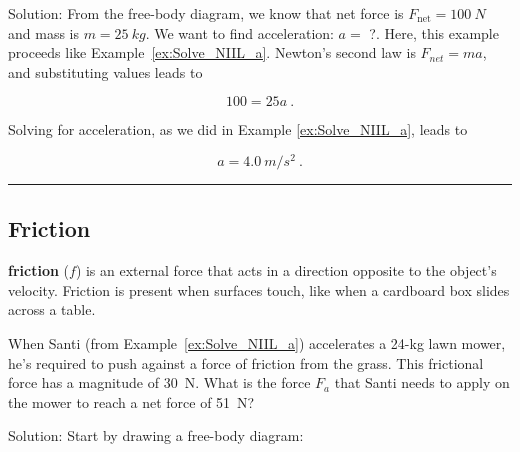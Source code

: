\documentclass{article}
\begin{document}
Solution: From the free-body diagram, we know that net force is $F_{\text{net}} = \SI{100}{N}$ and mass is $m = \SI{25}{kg}$. We want to find acceleration: $a =$ ?. Here, this example proceeds like Example~\ref{ex:Solve_NIIL_a}. Newton's second law is $F_{net} = ma$, and substituting values leads to

\begin{equation*}
    100 = 25 a\ .
\end{equation*}

Solving for acceleration, as we did in Example \ref{ex:Solve_NIIL_a}, leads to

\begin{equation*}
    a = \SI{4.0}{m/s^2}\ .
\end{equation*}

\vspace{2ex}

\hrule


\subsection{Friction} \label{lk8L5k}

\textbf{friction} ($f$) is an external force that acts in a direction opposite to the object's velocity. Friction is present when surfaces touch, like when a cardboard box slides across a table.

\begin{example}
When Santi (from Example~\ref{ex:Solve_NIIL_a}) accelerates a 24-kg lawn mower, he's required to push against a force of friction from the grass. This frictional force has a magnitude of \SI{30}{N}. What is the force $F_a$ that Santi needs to apply on the mower to reach a net force of \SI{51}{N}?
\end{example}

Solution: Start by drawing a free-body diagram:

\begin{center}

\end{center}
\end{document}
